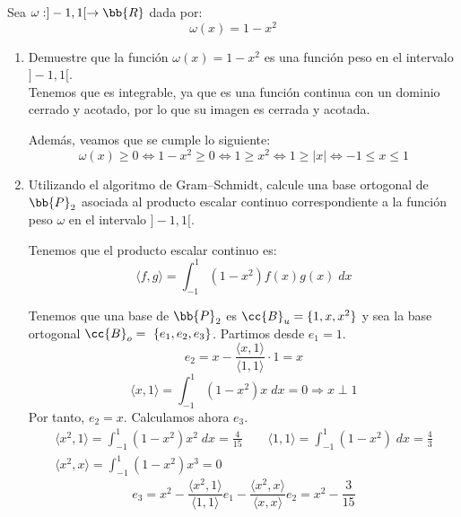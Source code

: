 \begin{ejercicio} Sea $\omega : ]-1,1[\to \bb{R}$ dada por:
\begin{equation*}
    \omega(x) = 1 - x^2
\end{equation*}

    \begin{enumerate}
        \item Demuestre que la función $\omega(x) = 1 - x^2$ es una función peso en el intervalo $]-1,1[$.\\

        Tenemos que es integrable, ya que es una función continua con un dominio cerrado y acotado, por lo que su imagen es cerrada y acotada.

        Además, veamos que se cumple lo siguiente:
        \begin{equation*}
            \omega(x)\geq 0 \Longleftrightarrow
            1-x^2\geq 0
            \Longleftrightarrow
            1\geq x^2
            \Longleftrightarrow
            1\geq |x|
            \Longleftrightarrow -1 \leq x \leq 1
        \end{equation*}

        \item Utilizando el algoritmo de Gram–Schmidt, calcule una base ortogonal de $\bb{P}_2$ asociada al producto escalar continuo correspondiente a la función peso $\omega$ en el intervalo $]-1, 1[$.

        Tenemos que el producto escalar continuo es:
        \begin{equation*}
            \langle f,g \rangle = \int_{-1}^1 (1-x^2)f(x)g(x)\;dx
        \end{equation*}

        Tenemos que una base de $\bb{P}_2$ es $\cc{B}_u=\{1,x,x^2\}$ y sea la base ortogonal $\cc{B}_o=~\{e_1, e_2, e_3\}$. Partimos desde $e_1=1$.
        \begin{equation*}
            e_2 = x-\frac{\langle x,1\rangle}{\langle 1,1\rangle}\cdot 1 = x
        \end{equation*}
        \begin{equation*}
            \langle x,1\rangle = \int_{-1}^1(1-x^2)x\;dx = 0 \Longrightarrow x\perp 1
        \end{equation*}
        Por tanto, $e_2=x$. Calculamos ahora $e_3$.
        \begin{gather*}
            \langle x^2,1\rangle = \int_{-1}^1(1-x^2)x^2\;dx = \frac{4}{15}
            \qquad
            \langle 1,1\rangle = \int_{-1}^1(1-x^2)\;dx = \frac{4}{3}
            \\
            \langle x^2,x\rangle = \int_{-1}^1(1-x^2)x^3=0
        \end{gather*}
        \begin{equation*}
            e_3 = x^2 - \frac{\langle x^2,1\rangle}{\langle 1,1\rangle}e_1
            - \frac{\langle x^2,x\rangle}{\langle x,x\rangle}e_2
            = x^2 -\frac{3}{15}
        \end{equation*}


\end{enumerate}
\end{ejercicio}
